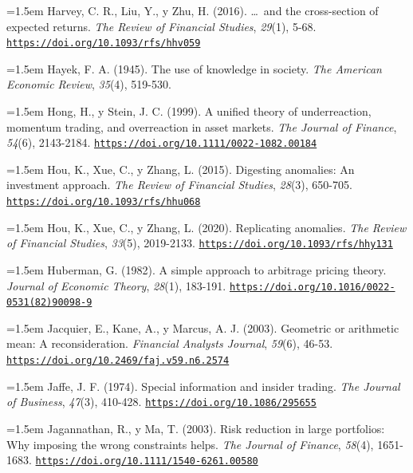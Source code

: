 \documentclass[10pt,a4paper]{article}
\begin{document}
\noindent\hangindent=1.5em Harvey, C. R., Liu, Y., y Zhu, H. (2016). \ldots\ and the cross-section of expected returns. \textit{The Review of Financial Studies}, \textit{29}(1), 5-68. \href{https://doi.org/10.1093/rfs/hhv059}{\nolinkurl{https://doi.org/10.1093/rfs/hhv059}}

\noindent\hangindent=1.5em Hayek, F. A. (1945). The use of knowledge in society. \textit{The American Economic Review}, \textit{35}(4), 519-530.

\noindent\hangindent=1.5em Hong, H., y Stein, J. C. (1999). A unified theory of underreaction, momentum trading, and overreaction in asset markets. \textit{The Journal of Finance}, \textit{54}(6), 2143-2184. \href{https://doi.org/10.1111/0022-1082.00184}{\nolinkurl{https://doi.org/10.1111/0022-1082.00184}}

\noindent\hangindent=1.5em Hou, K., Xue, C., y Zhang, L. (2015). Digesting anomalies: An investment approach. \textit{The Review of Financial Studies}, \textit{28}(3), 650-705. \href{https://doi.org/10.1093/rfs/hhu068}{\nolinkurl{https://doi.org/10.1093/rfs/hhu068}}

\noindent\hangindent=1.5em Hou, K., Xue, C., y Zhang, L. (2020). Replicating anomalies. \textit{The Review of Financial Studies}, \textit{33}(5), 2019-2133. \href{https://doi.org/10.1093/rfs/hhy131}{\nolinkurl{https://doi.org/10.1093/rfs/hhy131}}

\noindent\hangindent=1.5em Huberman, G. (1982). A simple approach to arbitrage pricing theory. \textit{Journal of Economic Theory}, \textit{28}(1), 183-191. \href{https://doi.org/10.1016/0022-0531(82)90098-9}{\nolinkurl{https://doi.org/10.1016/0022-0531(82)90098-9}}

\noindent\hangindent=1.5em Jacquier, E., Kane, A., y Marcus, A. J. (2003). Geometric or arithmetic mean: A reconsideration. \textit{Financial Analysts Journal}, \textit{59}(6), 46-53. \href{https://doi.org/10.2469/faj.v59.n6.2574}{\nolinkurl{https://doi.org/10.2469/faj.v59.n6.2574}}

\noindent\hangindent=1.5em Jaffe, J. F. (1974). Special information and insider trading. \textit{The Journal of Business}, \textit{47}(3), 410-428. \href{https://doi.org/10.1086/295655}{\nolinkurl{https://doi.org/10.1086/295655}}

\noindent\hangindent=1.5em Jagannathan, R., y Ma, T. (2003). Risk reduction in large portfolios: Why imposing the wrong constraints helps. \textit{The Journal of Finance}, \textit{58}(4), 1651-1683. \href{https://doi.org/10.1111/1540-6261.00580}{\nolinkurl{https://doi.org/10.1111/1540-6261.00580}}
\end{document}
